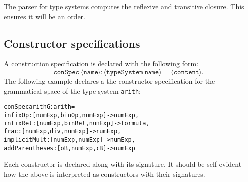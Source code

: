 \documentclass[a4paper]{article}
\theoremstyle{definition}
\begin{document}
	The parser for type systems computes the reflexive and transitive closure. This ensures it will be an order.

	\subsection{Constructor specifications}
	A construction specification is declared with the following form: $$\mathtt{conSpec\ \langle name\rangle : \langle typeSystem\ name\rangle = \langle content\rangle}.$$ The following example declares a the constructor specification for the grammatical space of the type system \texttt{arith}:
\begin{alltt}
conSpec arithG:arith =
    infixOp : [numExp,binOp,numExp] -> numExp,
    infixRel : [numExp,binRel,numExp] -> formula,
    frac : [numExp,div,numExp] -> numExp,
    implicitMult : [numExp,numExp] -> numExp,
    addParentheses : [oB,numExp,cB] -> numExp
\end{alltt}
	Each constructor is declared along with its signature. It should be self-evident how the above is interpreted as constructors with their signatures.
	
\end{document}
